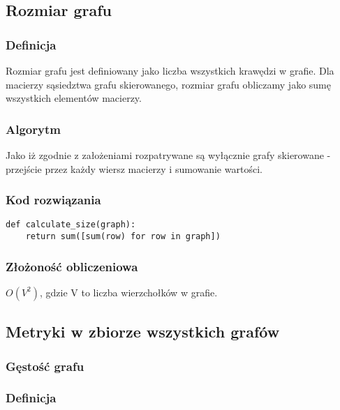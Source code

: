 \documentclass[a4paper, 12pt]{article}
\begin{document}
\subsection{Rozmiar grafu}

\subsubsection*{Definicja}

Rozmiar grafu jest definiowany jako liczba wszystkich krawędzi w grafie. Dla macierzy sąsiedztwa grafu skierowanego, rozmiar grafu obliczamy jako sumę wszystkich elementów macierzy. \cite{rozmiar_grafu}

\subsubsection*{Algorytm}

Jako iż zgodnie z założeniami rozpatrywane są wyłącznie grafy skierowane - przejście przez każdy wiersz macierzy i sumowanie wartości.

\subsubsection*{Kod rozwiązania}

\begin{verbatim}
def calculate_size(graph):
    return sum([sum(row) for row in graph])
\end{verbatim}

\subsubsection*{Złożoność obliczeniowa}

$O(V^2)$, gdzie V to liczba wierzchołków w grafie.

\subsection{Metryki w zbiorze wszystkich grafów}

\subsubsection{Gęstość grafu}

\subsubsection*{Definicja}
\end{document}
